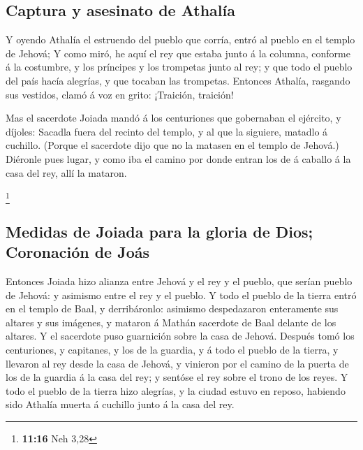 \hypertarget{captura-y-asesinato-de-athaluxeda}{%
\subsection{Captura y asesinato de
Athalía}\label{captura-y-asesinato-de-athaluxeda}}

 Y oyendo Athalía el estruendo del pueblo que corría,
entró al pueblo en el templo de Jehová;  Y como miró, he
aquí el rey que estaba junto á la columna, conforme á la costumbre, y
los príncipes y los trompetas junto al rey; y que todo el pueblo del
país hacía alegrías, y que tocaban las trompetas. Entonces Athalía,
rasgando sus vestidos, clamó á voz en grito: ¡Traición, traición!

 Mas el sacerdote Joiada mandó á los centuriones que
gobernaban el ejército, y díjoles: Sacadla fuera del recinto del templo,
y al que la siguiere, matadlo á cuchillo. (Porque el sacerdote dijo que
no la matasen en el templo de Jehová.)  Diéronle pues
lugar, y como iba el camino por donde entran los de á caballo á la casa
del rey, allí la mataron.

\footnote{\textbf{11:16} Neh 3,28}

\hypertarget{medidas-de-joiada-para-la-gloria-de-dios-coronaciuxf3n-de-jouxe1s}{%
\subsection{Medidas de Joiada para la gloria de Dios; Coronación de
Joás}\label{medidas-de-joiada-para-la-gloria-de-dios-coronaciuxf3n-de-jouxe1s}}

 Entonces Joiada hizo alianza entre Jehová y el rey y el
pueblo, que serían pueblo de Jehová: y asimismo entre el rey y el
pueblo.  Y todo el pueblo de la tierra entró en el templo
de Baal, y derribáronlo: asimismo despedazaron enteramente sus altares y
sus imágenes, y mataron á Mathán sacerdote de Baal delante de los
altares. Y el sacerdote puso guarnición sobre la casa de Jehová.
 Después tomó los centuriones, y capitanes, y los de la
guardia, y á todo el pueblo de la tierra, y llevaron al rey desde la
casa de Jehová, y vinieron por el camino de la puerta de los de la
guardia á la casa del rey; y sentóse el rey sobre el trono de los reyes.
 Y todo el pueblo de la tierra hizo alegrías, y la ciudad
estuvo en reposo, habiendo sido Athalía muerta á cuchillo junto á la
casa del rey.

